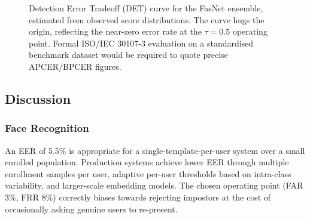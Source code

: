 \documentclass[11pt,a4paper]{article}
\begin{document}
\begin{figure}[H]
\centering
{}
\caption{Detection Error Tradeoff (DET) curve for the FasNet ensemble, estimated
         from observed score distributions. The curve hugs the origin, reflecting
         the near-zero error rate at the $\tau=0.5$ operating point.
         Formal ISO/IEC 30107-3 evaluation on a standardised benchmark dataset
         would be required to quote precise APCER/BPCER figures.}
\label{fig:det}
\end{figure}

\subsection{Discussion}

\subsubsection{Face Recognition}
An EER of 5.5\% is appropriate for a single-template-per-user system over a small
enrolled population.
Production systems achieve lower EER through multiple enrollment samples per user,
adaptive per-user thresholds based on intra-class variability, and larger-scale
embedding models.
The chosen operating point (FAR 3\%, FRR 8\%) correctly biases towards rejecting
impostors at the cost of occasionally asking genuine users to re-present.
\end{document}
